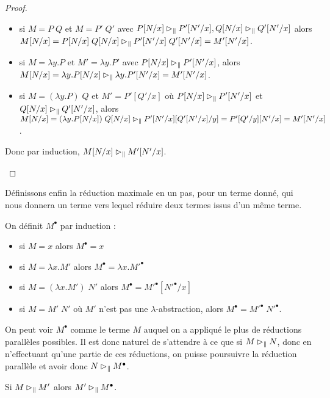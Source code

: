 \begin{proof}
\begin{itemize}[label=$\bullet$]
\begin{itemize}[label=$\bullet$]
            \item si $M = P\;Q$ et $M = P'\;Q'$ avec $P[N/x]\rhd_\| P'[N'/x],Q[N/x]\rhd_\| Q'[N'/x]$ alors $M[N/x] = P[N/x]\;Q[N/x] \rhd_\| P'[N'/x]\;Q'[N'/x] = M'[N'/x]$.
            \item si $M = \lambda y.P$ et $M' = \lambda y.P'$ avec $P[N/x]\rhd_\| P'[N'/x]$, alors $M[N/x] = \lambda y.P[N/x] \rhd_\| \lambda y.P'[N'/x] = M'[N'/x]$.
            \item si $M = (\lambda y.P)\;Q$ et $M' = P'[Q'/x]$ où $P[N/x]\rhd_\| P'[N'/x]$ et $Q[N/x]\rhd_\| Q'[N'/x]$, alors $M[N/x] = (\lambda y.P[N/x])\;Q[N/x]\rhd_\| P'[N'/x][Q'[N'/x]/y] = P'[Q'/y][N'/x] = M'[N'/x]$.
        \end{itemize}
        Donc par induction, $M[N/x]\rhd_\|M'[N'/x]$.
    \end{itemize}
\end{proof}

Définissons enfin la réduction maximale en un pas, pour un terme donné, qui nous donnera un terme vers lequel réduire deux termes issus d'un même terme.

\begin{defi}
    On définit $M^\bullet$ par induction :
    \begin{itemize}[label=$\bullet$]
        \item si $M = x$ alors $M^\bullet = x$
        \item si $M = \lambda x.M'$ alors $M^\bullet = \lambda x.M'^\bullet$
        \item si $M = (\lambda x.M')\;N'$ alors $M^\bullet = M'^\bullet[N'^\bullet/x]$
        \item si $M = M'\;N'$ où $M'$ n'est pas une $\lambda$-abstraction, alors $M^\bullet = M'^\bullet\;N'^\bullet$.
    \end{itemize}
\end{defi}

On peut voir $M^\bullet$ comme le terme $M$ auquel on a appliqué le plus de réductions parallèles possibles. Il est donc naturel de s'attendre à ce que si $M\rhd_\| N$, donc en n'effectuant qu'une partie de ces réductions, on puisse poursuivre la réduction parallèle et avoir donc $N\rhd_\|M^\bullet$.

\begin{prop}
    Si $M\rhd_\| M'$ alors $M'\rhd_\| M^\bullet$.
\end{prop}

